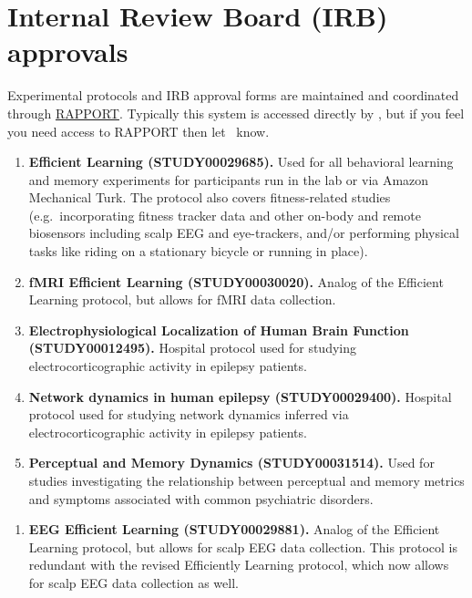 \documentclass{tufte-book} %
\begin{document}
\chapter{Internal Review Board (IRB) approvals}\label{ch:irb}
Experimental  protocols and IRB approval forms are maintained and
coordinated through \href{https://rapport.dartmouth.edu/}{RAPPORT}.
Typically this system is accessed directly by \director, but if you
feel you need access to RAPPORT then let \director~know.


 \begin{enumerate}
 \item \textbf{Efficient Learning (STUDY00029685).}  Used for all
   behavioral learning and memory experiments for participants run in
   the lab or via Amazon Mechanical Turk.  The protocol also covers
   fitness-related studies (e.g.\ incorporating fitness tracker data
   and other on-body and remote biosensors including scalp EEG and
   eye-trackers, and/or performing physical tasks like riding on a
   stationary bicycle or running in place).
    \item \textbf{fMRI Efficient Learning (STUDY00030020).}  Analog of
      the Efficient Learning protocol, but allows for fMRI data
      collection.
    \item \textbf{Electrophysiological Localization of Human Brain
        Function (STUDY00012495).}  Hospital protocol used for
      studying electrocorticographic activity in epilepsy patients.
    \item \textbf{Network dynamics in human epilepsy (STUDY00029400).}
      Hospital protocol used for studying network dynamics inferred
      via electrocorticographic activity in epilepsy patients.
    \item \textbf{Perceptual and Memory Dynamics (STUDY00031514).}
      Used for studies investigating the relationship between
      perceptual and memory metrics and symptoms associated with
      common psychiatric disorders.

   \end{enumerate}

 \begin{enumerate}
 \item \textbf{EEG Efficient Learning (STUDY00029881).} Analog of the
   Efficient Learning protocol, but allows for scalp EEG data
   collection.  This protocol is redundant with the revised
   Efficiently Learning protocol, which now allows for scalp EEG data
   collection as well.
   \end{enumerate}
\end{document}
